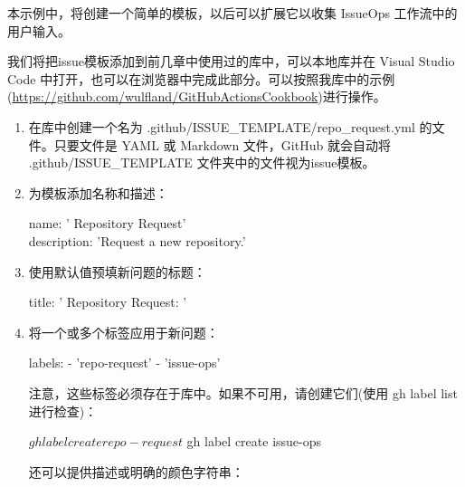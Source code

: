 本示例中，将创建一个简单的模板，以后可以扩展它以收集 IssueOps 工作流中的用户输入。


我们将把issue模板添加到前几章中使用过的库中，可以本地库并在 Visual Studio Code 中打开，也可以在浏览器中完成此部分。可以按照我库中的示例(\url{https://github.com/wulfland/GitHubActionsCookbook})进行操作。


\begin{enumerate}
\item 
在库中创建一个名为 .github/ISSUE\_TEMPLATE/repo\_request.yml 的文件。只要文件是 YAML 或 Markdown 文件，GitHub 就会自动将 .github/ISSUE\_TEMPLATE 文件夹中的文件视为issue模板。

\item 
为模板添加名称和描述：

\begin{tcolorbox}[ breakable,colback = bashcodebg, colframe= black!50!white]
\scriptsize{
name: ' Repository Request'\\
description: 'Request a new repository.'
}
\end{tcolorbox}

\item 
使用默认值预填新问题的标题：

\begin{tcolorbox}[ breakable,colback = bashcodebg, colframe= black!50!white]
\scriptsize{
title: ' Repository Request: '
}
\end{tcolorbox}

\item 
将一个或多个标签应用于新问题：

\begin{shell}
labels:
  - 'repo-request'
  - 'issue-ops'
\end{shell}

注意，这些标签必须存在于库中。如果不可用，请创建它们(使用 gh label list 进行检查)：

\begin{shell}
$ gh label create repo-request
$ gh label create issue-ops
\end{shell}

还可以提供描述或明确的颜色字符串：



\end{enumerate}
